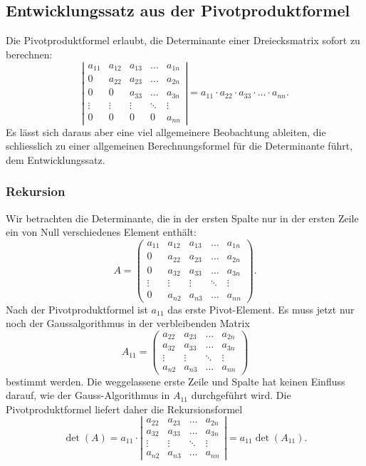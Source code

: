 %
%
%
\subsection{Entwicklungssatz aus der Pivotproduktformel}
Die Pivotproduktformel erlaubt, die Determinante einer Dreiecksmatrix sofort
zu berechnen:
\[
\left|\begin{matrix}
a_{11}&a_{12}&a_{13}&\dots &a_{1n}\\
  0   &a_{22}&a_{23}&\dots &a_{2n}\\
  0   &  0   &a_{33}&\dots &a_{3n}\\
\vdots&\vdots&\vdots&\ddots&\vdots\\
  0   &  0   &   0  &  0   &a_{nn}
\end{matrix}\right|
=
a_{11}\cdot a_{22}\cdot a_{33}\cdot\dots\cdot a_{nn}.
\]
Es lässt sich daraus aber eine viel allgemeinere Beobachtung ableiten, die
schliesslich zu einer allgemeinen Berechnungsformel für die Determinante
führt, dem Entwicklungssatz.

\subsubsection{Rekursion}
Wir betrachten die Determinante, die in der ersten Spalte nur in der
ersten Zeile ein von Null verschiedenes Element enthält:
\[
A=
\begin{pmatrix}
a_{11}&a_{12}&a_{13}&\dots &a_{1n}\\
  0   &a_{22}&a_{23}&\dots &a_{2n}\\
  0   &a_{32}&a_{33}&\dots &a_{3n}\\
\vdots&\vdots&\vdots&\ddots&\vdots\\
  0   &a_{n2}&a_{n3}&\dots &a_{nn}
\end{pmatrix}.
\]
Nach der Pivotproduktformel ist $a_{11}$ das erste Pivot-Element.
Es muss jetzt nur noch der Gaussalgorithmus in der verbleibenden Matrix
\[
A_{11}
=
\begin{pmatrix}
a_{22}&a_{23}&\dots &a_{2n}\\
a_{32}&a_{33}&\dots &a_{3n}\\
\vdots&\vdots&\ddots&\vdots\\
a_{n2}&a_{n3}&\dots &a_{nn}
\end{pmatrix}
\]
bestimmt werden.
Die weggelassene erste Zeile und Spalte hat keinen Einfluss darauf, wie
der Gauss-Algorithmus in $A_{11}$ durchgeführt wird.
Die Pivotproduktformel liefert daher die Rekursionsformel
\begin{equation}
\det(A)
=
a_{11}\cdot
\left|\begin{matrix}
a_{22}&a_{23}&\dots &a_{2n}\\
a_{32}&a_{33}&\dots &a_{3n}\\
\vdots&\vdots&\ddots&\vdots\\
a_{n2}&a_{n3}&\dots &a_{nn}
\end{matrix} \right|
=
a_{11}
\det(A_{11}).
\label{determinante:entwicklungssatz:rekursion}
\end{equation}

